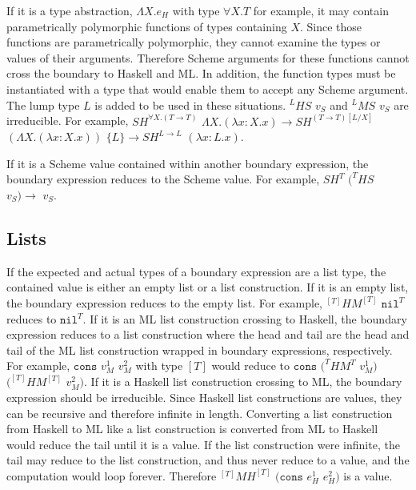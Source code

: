 If it is a type abstraction, $\Lambda X.e_{H}$ with type $\forall X.T$ for example, it may contain parametrically polymorphic functions of types containing $X$.  Since those functions are parametrically polymorphic, they cannot examine the types or values of their arguments.  Therefore Scheme arguments for these functions cannot cross the boundary to Haskell and ML.  In addition, the function types must be instantiated with a type that would enable them to accept any Scheme argument.  The lump type $L$ is added to be used in these situations.  $^{L}HS$ $v_{S}$ and $^{L}MS$ $v_{S}$ are irreducible.  For example, $SH^{\forall X.(T\rightarrow T)}$ $\Lambda X.(\lambda x:X.x)\rightarrow SH^{(T\rightarrow T)[L/X]}$ $(\Lambda X.(\lambda x:X.x))$ $\lbrace L\rbrace\rightarrow SH^{L\rightarrow L}$ $(\lambda x:L.x)$.

If it is a Scheme value contained within another boundary expression, the boundary expression reduces to the Scheme value.  For example, $SH^{T}$ $(^{T}HS$ $v_{S})\rightarrow$ $v_{S}$.

\subsection{Lists}

If the expected and actual types of a boundary expression are a list type, the contained value is either an empty list or a list construction.  If it is an empty list, the boundary expression reduces to the empty list.  For example, $^{[T]}HM^{[T]}$ $\mathtt{nil}^{T}$ reduces to $\mathtt{nil}^{T}$.  If it is an ML list construction crossing to Haskell, the boundary expression reduces to a list construction where the head and tail are the head and tail of the ML list construction wrapped in boundary expressions, respectively.  For example, $\mathtt{cons}$ $v_{M}^{1}$ $v_{M}^{2}$ with type $[T]$ would reduce to $\mathtt{cons}$ $(^{T}HM^{T}$ $v_{M}^{1})$ $(^{[T]}HM^{[T]}$ $v_{M}^{2})$.  If it is a Haskell list construction crossing to ML, the boundary expression should be irreducible.  Since Haskell list constructions are values, they can be recursive and therefore infinite in length.  Converting a list construction from Haskell to ML like a list construction is converted from ML to Haskell would reduce the tail until it is a value.  If the list construction were infinite, the tail may reduce to the list construction, and thus never reduce to a value, and the computation would loop forever.  Therefore $^{[T]}MH^{[T]}$ $(\mathtt{cons}$ $e_{H}^{1}$ $e_{H}^{2})$ is a value.

